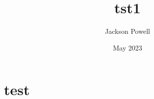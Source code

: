 \documentclass[12]{amsart}
\title{tst1}
\author{Jackson Powell}
\date{May 2023}
\begin{document}
\maketitle

\section{test}
\end{document}
